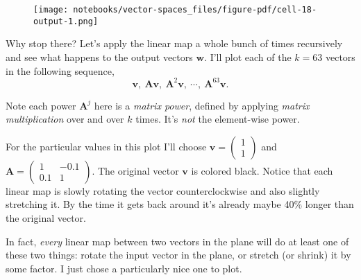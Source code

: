 \documentclass[
  letterpaper,
  DIV=11,
  numbers=noendperiod]{scrreprt}
\begin{document}
\begin{figure}[H]

{\centering \texttt{[image: notebooks/vector-spaces\_files/figure-pdf/cell-18-output-1.png]}

}

\end{figure}

Why stop there? Let's apply the linear map a whole bunch of times
recursively and see what happens to the output vectors \(\mathbf{w}\).
I'll plot each of the \(k=63\) vectors in the following sequence,
\[\mathbf{v}, \ \mathbf{A}\mathbf{v}, \ \mathbf{A}^2\mathbf{v}, \ \cdots, \ \mathbf{A}^{63}\mathbf{v}.\]

Note each power \(\mathbf{A}^j\) here is a \emph{matrix power}, defined
by applying \emph{matrix multiplication} over and over \(k\) times. It's
\emph{not} the element-wise power.

For the particular values in this plot I'll choose
\(\mathbf{v}=\begin{pmatrix} 1 \\ 1 \end{pmatrix}\) and
\(\mathbf{A}=\begin{pmatrix} 1 & -0.1 \\ 0.1 & 1 \end{pmatrix}\). The
original vector \(\mathbf{v}\) is colored black. Notice that each linear
map is slowly rotating the vector counterclockwise and also slightly
stretching it. By the time it gets back around it's already maybe 40\%
longer than the original vector.

In fact, \emph{every} linear map between two vectors in the plane will
do at least one of these two things: rotate the input vector in the
plane, or stretch (or shrink) it by some factor. I just chose a
particularly nice one to plot.
\end{document}
